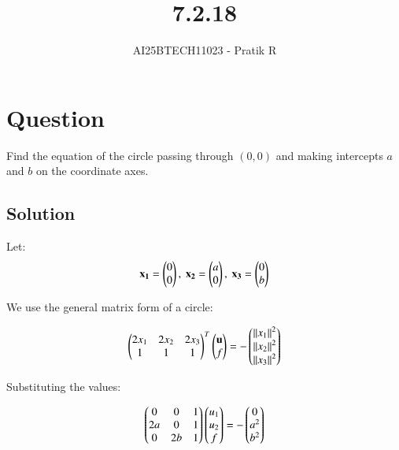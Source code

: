 \documentclass[journal]{IEEEtran}
\begin{document}

\vspace{3cm}

\title{7.2.18}
\author{AI25BTECH11023 - Pratik R}
{\let\newpage\relax\maketitle}

\renewcommand{\thefigure}{\theenumi}
\renewcommand{\thetable}{\theenumi}
\setlength{\intextsep}{10pt} %


\renewcommand{\thetable}{\theenumi}


\section*{\textbf{Question}}
Find the equation of the circle passing through $(0, 0)$ and making intercepts $a$ and $b$ on the coordinate axes.


\subsection*{\textbf{Solution}}

Let:
\begin{align}
\mathbf{x_1} = \begin{pmatrix}0 \\ 0\end{pmatrix},\ \mathbf{x_2} = \begin{pmatrix}a \\ 0\end{pmatrix},\ \mathbf{x_3} = \begin{pmatrix}0 \\ b\end{pmatrix}
\end{align}

We use the general matrix form of a circle:


\begin{align}
\begin{pmatrix}2x_1 & 2x_2 & 2x_3\\
1 & 1 & 1\end{pmatrix}^T \begin{pmatrix}\mathbf{u} \\ f\end{pmatrix} = - \begin{pmatrix}\left\lVert x_1\right\rVert^2 \\ \left\lVert x_2\right\rVert^2 \\ \left\lVert x_3\right\rVert^2\end{pmatrix}
\end{align}

Substituting the values:

\begin{align}
\begin{pmatrix}
0 & 0 & 1 \\
2a & 0 & 1 \\
0 & 2b & 1
\end{pmatrix}
\begin{pmatrix}
u_1 \\
u_2 \\
f
\end{pmatrix}
=
- \begin{pmatrix}
0 \\
a^2 \\
b^2
\end{pmatrix}
\end{align}
\end{document}
